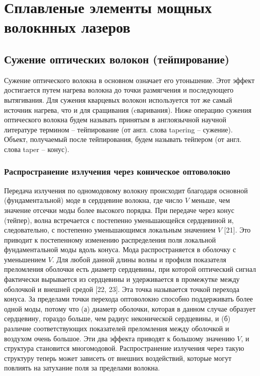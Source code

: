 \chapter{Сплавленые элементы мощных волокнных лазеров}
\label{ch2}

\section{Сужение оптических волокон (тейпирование)}

Сужение оптического волокна в основном означает его утоньшение. Этот эффект достигается путем нагрева волокна до точки размягчения и последующего вытягивания. Для сужения кварцевых волокон используется тот же самый источник нагрева, что и для сращивания (cваривания).  Ниже операцию сужения оптического волокна будем называть принятым в англоязычной научной литературе термином -- тейпирование (от англ. слова tapering -- сужение). Объект, получаемый после тейпирования, будем называть тейпером (от англ. слова taper -- конус).

\subsection{Распространение излучения через коническое оптоволокно}

Передача излучения по одномодовому волокну происходит благодаря основной (фундаментальной) моде в сердцевине волокна, где число $V$ меньше, чем значение отсечки моды более высокого порядка. При передаче через конус (тейпер), волна встречается с постепенно уменьшающейся сердцевиной и, следовательно, с постепенно уменьшающимся локальным значением $V$ [21]. Это приводит к постепенному изменению распределения поля локальной фундаментальной моды вдоль конуса. Мода распространяется в оболочку с уменьшением $V$. Для любой данной длины волны и профиля показателя преломления оболочки есть диаметр сердцевины, при которой оптический сигнал фактически вырывается из сердцевины и удерживается в промежутке между оболочкой и внешней средой [22, 23]. Эта точка называется точкой перехода конуса. За пределами точки перехода оптоволокно способно поддерживать более одной моды, потому что (а) диаметр оболочки, которая в данном случае образует сердцевину, гораздо больше, чем радиус неконической сердцевины, и (б) различие соответствующих показателей преломления между оболочкой и воздухом очень большое. Эти два эффекта приводят к большому значению $V$, и структура становится многомодовой. Распространение излучения через такую структуру теперь может зависеть от внешних воздействий, которые могут повлиять на затухание поля за пределами волокна.

